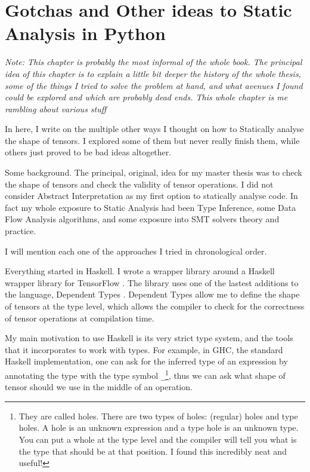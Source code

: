 \chapter{Gotchas and Other ideas to Static Analysis in Python}%
\label{gotchas-and-other-ideas-to-static-analysis-in-python}


\emph{\large Note: This chapter is probably the most informal of the whole
book. The principal idea of this chapter is to explain a little bit
deeper the history of the whole thesis, some of the things I tried to
solve the problem at hand, and what avenues I found could be explored
and which are probably dead ends. This whole chapter is me rambling
about various stuff}

In here, I write on the multiple other ways I thought on how to
Statically analyse the shape of tensors. I explored some of them but
never really finish them, while others just proved to be bad ideas
altogether.

Some background. The principal, original, idea for my master thesis was
to check the shape of tensors and check the validity of tensor
operations. I did not consider Abstract Interpretation as my first
option to statically analyse code. In fact my whole exposure to Static
Analysis had been Type Inference, some Data Flow Analysis algorithms,
and some exposure into SMT solvers theory and practice.

I will mention each one of the approaches I tried in chronological
order.

{}

Everything started in Haskell. I wrote a wrapper library around a
Haskell wrapper library for TensorFlow \autocite{abadi_tensorflow_2016}.
The library uses one of the lastest additions to the language, Dependent
Types \autocite{eisenberg_dependent_2016}. Dependent Types allow me to
define the shape of tensors at the type level, which allows the compiler
to check for the correctness of tensor operations at compilation time.

My main motivation to use Haskell is its very strict type system, and
the tools that it incorporates to work with types. For example, in GHC,
the standard Haskell implementation, one can ask for the inferred type
of an expression by annotating the type with the type symbol
\texttt{\_}\footnote{They are called holes. There are two types of
  holes: (regular) holes and type holes. A hole is an unknown expression
  and a type hole is an unknown type. You can put a whole at the type
  level and the compiler will tell you what is the type that should be
  at that position. I found this incredibly neat and useful!}, thus we
can ask what shape of tensor should we use in the middle of an
operation.

